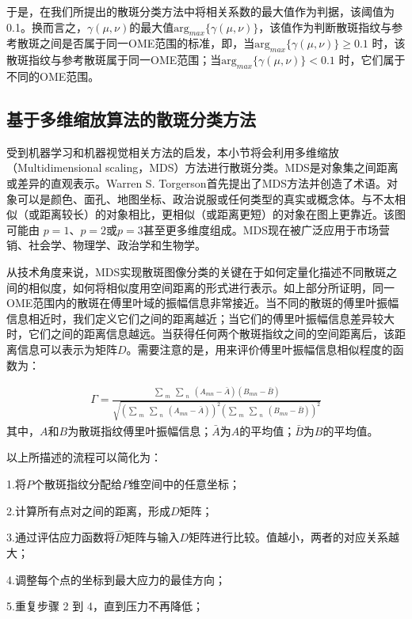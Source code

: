 于是，在我们所提出的散斑分类方法中将相关系数的最大值作为判据，该阈值为0.1。换而言之，$\gamma (\mu,\nu)$的最大值$\mbox{arg}_{max} \{ \gamma (\mu,\nu) \}$，该值作为判断散斑指纹与参考散斑之间是否属于同一OME范围的标准，即，当$\mbox{arg}_{max} \{ \gamma (\mu,\nu) \} \geq 0.1 $ 时，该散斑指纹与参考散斑属于同一OME范围；当$\mbox{arg}_{max} \{ \gamma (\mu,\nu) \} < 0.1 $ 时，它们属于不同的OME范围。

\subsection{基于多维缩放算法的散斑分类方法}\label{speckle_classify}

受到机器学习和机器视觉相关方法的启发，本小节将会利用多维缩放（Multidimensional scaling，MDS）方法进行散斑分类。MDS是对象集之间距离或差异的直观表示。Warren S. Torgerson首先提出了MDS方法并创造了术语\cite{torgerson_multidimensional_1952}。对象可以是颜色、面孔、地图坐标、政治说服或任何类型的真实或概念体。与不太相似（或距离较长）的对象相比，更相似（或距离更短）的对象在图上更靠近。该图可能由 $p = 1$、$p = 2$或$p = 3$甚至更多维度组成。MDS现在被广泛应用于市场营销、社会学、物理学、政治学和生物学\cite{de_leeuw_modern_2005}。

从技术角度来说，MDS实现散斑图像分类的关键在于如何定量化描述不同散斑之间的相似度，如何将相似度用空间距离的形式进行表示。如上部分所证明，同一OME范围内的散斑在傅里叶域的振幅信息非常接近。当不同的散斑的傅里叶振幅信息相近时，我们定义它们之间的距离越近；当它们的傅里叶振幅信息差异较大时，它们之间的距离信息越远。当获得任何两个散斑指纹之间的空间距离后，该距离信息可以表示为矩阵$D$。需要注意的是，用来评价傅里叶振幅信息相似程度的函数为：

\begin{equation}
\begin{aligned}
\Gamma = \frac{\sum_{\substack{m}}\sum_{\substack{n}} (A_{mn}-\bar{A}) ( B_{mn}-\bar{B})}{\sqrt{(\sum_{\substack{m}}\sum_{\substack{n}} (A_{mn}-\bar{A}))^2 (\sum_{\substack{m}}\sum_{\substack{n}}( B_{mn}-\bar{B}))^2}}
\label{eq:6.6}
\end{aligned}
\end{equation}
其中，$A$和$B$为散斑指纹傅里叶振幅信息；$\bar{A}$为$A$的平均值；$\bar{B}$为$B$的平均值。

以上所描述的流程可以简化为：\par
1.将$P$个散斑指纹分配给$P$维空间中的任意坐标；\par
2.计算所有点对之间的距离，形成$D$矩阵；\par
3.通过评估应力函数将$\hat{D}$矩阵与输入$D$矩阵进行比较。值越小，两者的对应关系越大；\par
4.调整每个点的坐标到最大应力的最佳方向；\par
5.重复步骤 2 到 4，直到压力不再降低；\par

